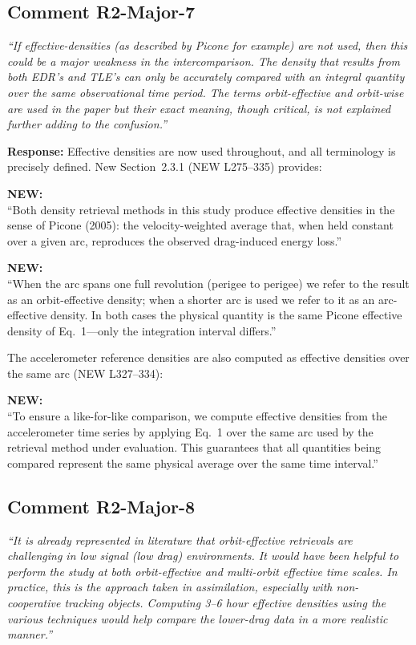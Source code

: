 \documentclass[11pt]{article}
\newcommand{\reviewercomment}[1]{%
  \medskip
  \noindent\textit{\color{reviewblue}#1}%
  \medskip
}
\newcommand{\newtext}[1]{%
  \smallskip
  \noindent\hspace{1em}\begin{minipage}{0.92\textwidth}%
  \color{quotegreen}\textbf{NEW:}\\[2pt]``#1''%
  \end{minipage}%
  \smallskip
}
\begin{document}
\subsection{Comment R2-Major-7}

\reviewercomment{%
``If effective-densities (as described by Picone for example) are not used, then this could be a major weakness in the intercomparison. The density that results from both EDR's and TLE's can only be accurately compared with an integral quantity over the same observational time period. The terms orbit-effective and orbit-wise are used in the paper but their exact meaning, though critical, is not explained further adding to the confusion.''}

\textbf{Response:}
Effective densities are now used throughout, and all terminology is precisely defined. New Section~2.3.1 (NEW L275--335) provides:

\newtext{Both density retrieval methods in this study produce effective densities in the sense of Picone (2005): the velocity-weighted average that, when held constant over a given arc, reproduces the observed drag-induced energy loss.}

\newtext{When the arc spans one full revolution (perigee to perigee) we refer to the result as an orbit-effective density; when a shorter arc is used we refer to it as an arc-effective density. In both cases the physical quantity is the same Picone effective density of Eq.~1---only the integration interval differs.}

The accelerometer reference densities are also computed as effective densities over the same arc (NEW L327--334):

\newtext{To ensure a like-for-like comparison, we compute effective densities from the accelerometer time series by applying Eq.~1 over the same arc used by the retrieval method under evaluation. This guarantees that all quantities being compared represent the same physical average over the same time interval.}


\subsection{Comment R2-Major-8}

\reviewercomment{%
``It is already represented in literature that orbit-effective retrievals are challenging in low signal (low drag) environments. It would have been helpful to perform the study at both orbit-effective and multi-orbit effective time scales. In practice, this is the approach taken in assimilation, especially with non-cooperative tracking objects. Computing 3--6 hour effective densities using the various techniques would help compare the lower-drag data in a more realistic manner.''}
\end{document}
